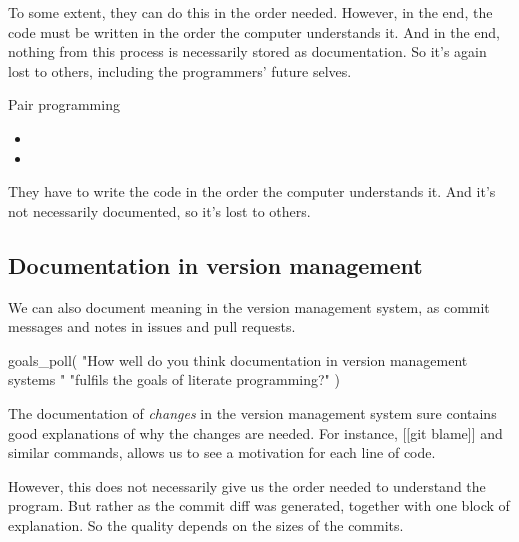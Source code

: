 To some extent, they can do this in the order needed.
However, in the end, the code must be written in the order the computer 
understands it.
And in the end, nothing from this process is necessarily stored as 
documentation.
So it's again lost to others, including the programmers' future selves.

\begin{frame}
\begin{block}{Pair programming}
  \begin{itemize}
    \item[\(-\)] {\color{red}\LPexplain}
    \item[\(-\)] {\color{red}\LPorder}
  \end{itemize}
\end{block}

\begin{remark}
  They have to write the code in the order the computer understands it.
  And it's not necessarily documented, so it's lost to others.
\end{remark}
\end{frame}

\subsection{Documentation in version management}

We can also document meaning in the version management system, as commit 
messages and notes in issues and pull requests.

\begin{frame}[fragile]
\begin{activity}
\begin{pycode}
goals_poll(
    "How well do you think documentation in version management systems "
    "fulfils the goals of literate programming?"
)
\end{pycode}
\end{activity}
\end{frame}

The documentation of \emph{changes} in the version management system sure 
contains good explanations of why the changes are needed.
For instance, [[git blame]] and similar commands, allows us to see a motivation 
for each line of code.

However, this does not necessarily give us the order needed to understand the 
program.
But rather as the commit diff was generated, together with one block of 
explanation.
So the quality depends on the sizes of the commits.

